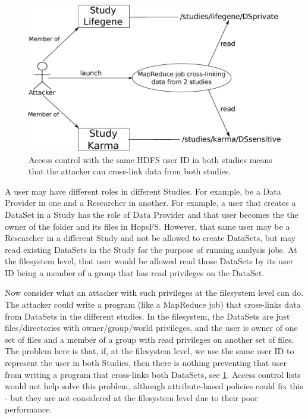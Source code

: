 \vspace{-5mm}
\begin{figure}[h]
 \centering
 \includegraphics[scale=0.3]{./imgs/studyIsolation.eps}
	\caption{Access control with the same HDFS user ID in both studies means that the attacker can cross-link data from both studies.}
	\label{fig:ac:problem:isolation}
\end{figure}
\vspace{-5mm}

A user may have different roles in different Studies. For example, be a Data Provider in one and a Researcher in another. For example, a user that creates a DataSet in a Study has the role of Data Provider and that user becomes the the owner of the folder and its files in HopsFS. However, that same user may be a Researcher in a different Study and not be allowed to create DataSets, but may read existing DataSets in the Study for the purpose of running analysis jobs. At the filesystem level, that user would be allowed read those DataSets by its user ID being a member of a group that has read privileges on the DataSet.

Now consider what an attacker with such privileges at the filesystem level can do. The attacker could write a program (like a MapReduce job) that cross-links data from DataSets in the different studies. In the filesystem, the DataSets are just files/directories with owner/group/world privileges, and the user is owner of one set of files and a member of a group with read privileges on another set of files. The problem here is that, if, at the filesystem level, we use the same user ID to represent the user in both Studies, then there is nothing preventing that user from writing a program that cross-links both DataSets, see \ref{fig:ac:problem:isolation}. Access control lists would not help solve this problem, although attribute-based policies could fix this - but they are not considered at the filesystem level due to their poor performance.


